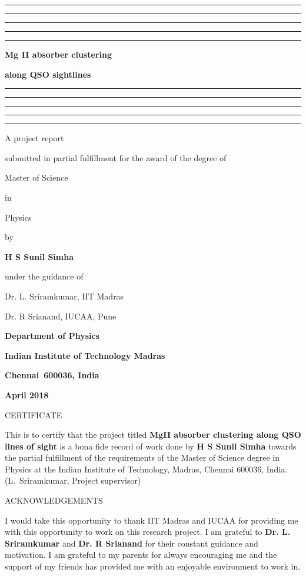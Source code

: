 \documentclass[12pt,a4paper,twoside]{book}
\begin{document}

\baselineskip 20pt




\thispagestyle{empty}
\topskip 15pt
\hrule\hrule\hrule\hrule\hrule
\vskip 20pt
\centerline{\Huge \bf Mg II absorber clustering} 
\vskip 15pt
\centerline{\Huge \bf along QSO sightlines} 
\vskip 20pt
\hrule\hrule\hrule\hrule\hrule
\vskip 30pt
\centerline{\Large A project report}
\vskip 8pt
\centerline{\Large submitted in partial fulfillment 
for the award of the degree of}
\vskip 8pt
\centerline{\Large Master of Science}
\vskip 8pt
\centerline{\Large in}
\vskip 8pt 
\centerline{\Large Physics}
\vskip 8pt
\centerline{\Large by}
\vskip 8pt
\centerline{\Large \bf H S Sunil Simha}
\vskip 8pt
\centerline{\Large under the guidance of}
\vskip 8pt
\centerline{\Large  Dr. L. Sriramkumar, IIT Madras}

\vskip 8pt
\centerline{\Large  Dr. R Srianand, IUCAA, Pune}
\vskip 30pt 
\begin{center}
\end{center}
\vskip 8pt 
\centerline{\Large \bf Department of Physics}
\vskip 8pt 
\centerline{\Large \bf Indian Institute of Technology Madras}
\vskip 8pt 
\centerline{\Large \bf Chennai~600036, India}
\vskip 8pt
\centerline{\Large \bf April 2018}

\newpage\topskip 40pt
\centerline{\Large CERTIFICATE}
\thispagestyle{empty}
\vskip 20pt\noindent 
This is to certify that the project titled {\bf MgII absorber clustering along QSO lines of sight} is a bona fide record of work done by 
{\bf H S Sunil Simha} towards the partial fulfillment of the 
requirements of the Master of Science degree in Physics at the Indian 
Institute of Technology, Madras, Chennai 600036, India.
\vskip 120pt
\hspace{240pt}(L.~Sriramkumar, Project supervisor)


\newpage\topskip 40pt
\thispagestyle{empty}
\centerline{\Large ACKNOWLEDGEMENTS}
\vskip 20pt\noindent 
I would take this opportunity to thank IIT Madras and IUCAA for providing me with this opportunity to work on this research project. I am grateful to {\bf Dr. L. Sriramkumar} and {\bf Dr. R Srianand} for their constant
guidance and motivation. 
I am grateful to my parents for always encouraging me and the support of my
friends has provided me with an enjoyable environment to work in.
\end{document}
